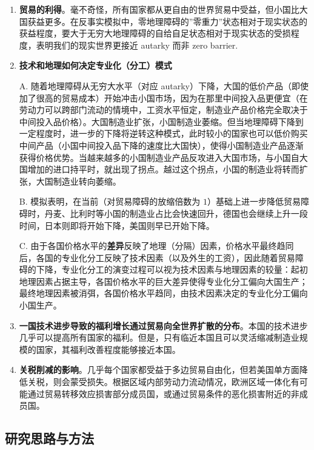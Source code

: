 \documentclass[
]{article}
\begin{document}
\begin{enumerate}
\def\labelenumi{\arabic{enumi}.}
\item
  \textbf{贸易的利得}。毫不奇怪，所有国家都从更自由的世界贸易中受益，但小国比大国获益更多。在反事实模拟中，零地理障碍的''零重力''状态相对于现实状态的获益程度，要大于无穷大地理障碍的自给自足状态相对于现实状态的受损程度，表明我们的现实世界更接近 autarky 而非 zero barrier.
\item
  \textbf{技术和地理如何决定专业化（分工）模式}

  A. 随着地理障碍从无穷大水平（对应 autarky）下降，大国的低价产品（即使加了很高的贸易成本）开始冲击小国市场，因为在那里中间投入品更便宜（在劳动力可以跨部门流动的情境中，工资水平恒定，制造业产品价格完全取决于中间投入品价格）。大国制造业扩张，小国制造业萎缩。但当地理障碍下降到一定程度时，进一步的下降将逆转这种模式，此时较小的国家也可以低价购买中间产品（小国中间投入品下降的速度比大国快），使得小国制造业产品逐渐获得价格优势。当越来越多的小国制造业产品反攻进入大国市场，与小国自大国增加的进口持平时，就出现了拐点。越过这个拐点，小国的制造业将转而扩张，大国制造业转向萎缩。

  B. 模拟表明，在当前（对贸易障碍的放缩倍数为 \(1\)）基础上进一步降低贸易障碍时，丹麦、比利时等小国的制造业占比会快速回升，德国也会继续上升一段时间，日本则即将开始下降，美国则早已开始下降。

  C. 由于各国价格水平的\textbf{差异}反映了地理（分隔）因素，价格水平最终趋同后，各国的专业化分工反映了技术因素（以及外生的工资），因此随着贸易障碍的下降，专业化分工的演变过程可以视为技术因素与地理因素的较量：起初地理因素占据主导，各国价格水平的巨大差异使得专业化分工偏向大国生产；最终地理因素被消弭，各国价格水平趋同，由技术因素决定的专业化分工偏向小国生产。
\item
  \textbf{一国技术进步导致的福利增长通过贸易向全世界扩散的分布}。本国的技术进步几乎可以提高所有国家的福利。但是，只有临近本国且可以灵活缩减制造业规模的国家，其福利改善程度能够接近本国。
\item
  \textbf{关税削减的影响}。几乎每个国家都受益于多边贸易自由化，但若美国单方面降低关税，则会蒙受损失。根据区域内部劳动力流动情况，欧洲区域一体化有可能通过贸易转移效应损害部分成员国，或通过贸易条件的恶化损害附近的非成员国。
\end{enumerate}

\hypertarget{ux7814ux7a76ux601dux8defux4e0eux65b9ux6cd5}{%
\subsection{研究思路与方法}\label{ux7814ux7a76ux601dux8defux4e0eux65b9ux6cd5}}
\end{document}
